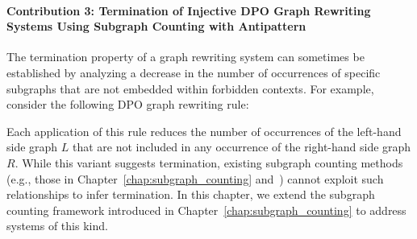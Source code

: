 \paragraph{Contribution 3: Termination of Injective DPO Graph Rewriting Systems Using Subgraph Counting with Antipattern}
The termination property of a graph rewriting system can sometimes be established by analyzing a decrease in the number of occurrences of specific subgraphs that are not embedded within forbidden contexts. For example, consider the following DPO graph rewriting rule:
 
 
Each application of this rule reduces the number of occurrences of the left-hand side graph $L$ that are not included in any occurrence of the right-hand side graph $ R $. While this variant suggests termination, existing subgraph counting methods (e.g., those in Chapter~\ref{chap:subgraph_counting} and~\cite{overbeek2024termination_lmcs}) cannot exploit such relationships to infer termination. In this chapter, we extend the subgraph counting framework introduced in Chapter~\ref{chap:subgraph_counting} to address systems of this kind.

